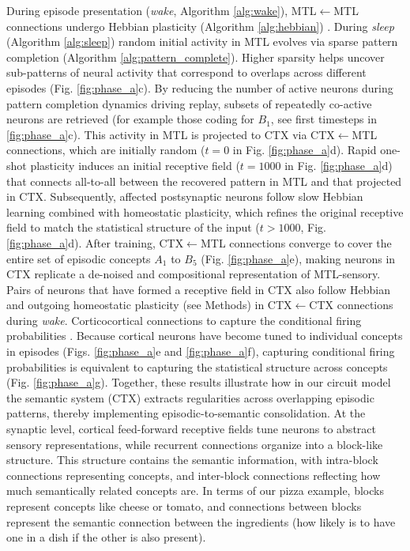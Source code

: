 \documentclass{article}
\begin{document}
During episode presentation (\textit{wake}, Algorithm \ref{alg:wake}), MTL$\leftarrow$MTL connections undergo Hebbian plasticity (Algorithm \ref{alg:hebbian}) . During \textit{sleep} (Algorithm \ref{alg:sleep}) random initial activity in MTL evolves via sparse pattern completion (Algorithm \ref{alg:pattern_complete}). Higher sparsity helps uncover sub-patterns of neural activity that correspond to overlaps across different episodes (Fig. \ref{fig:phase_a}c). By reducing the number of active neurons during pattern completion dynamics driving replay, subsets of repeatedly co-active neurons are retrieved (for example those coding for $B_1$, see first timesteps in \ref{fig:phase_a}c). This activity in MTL is projected to CTX via CTX$\leftarrow$MTL connections, which are initially random ($t=0$ in Fig. \ref{fig:phase_a}d). Rapid one-shot plasticity induces an initial receptive field ($t=1000$ in Fig. \ref{fig:phase_a}d) that connects all-to-all between the recovered pattern in MTL and that projected in CTX. Subsequently, affected postsynaptic neurons follow slow Hebbian learning combined with homeostatic plasticity, which refines the original receptive field to match the statistical structure of the input ($t > 1000$, Fig. \ref{fig:phase_a}d). After training, CTX$\leftarrow$MTL connections converge to cover the entire set of episodic concepts $A_1$ to $B_5$ (Fig. \ref{fig:phase_a}e), making neurons in CTX replicate a de-noised and compositional representation of MTL-sensory.
\newline\newline
Pairs of neurons that have formed a receptive field in CTX also follow Hebbian and outgoing homeostatic plasticity (see Methods) in CTX$\leftarrow$CTX connections during \textit{wake}.  Corticocortical connections to capture the conditional firing probabilities \cite{albesagonzalez_2025}. Because cortical neurons have become tuned to individual concepts in episodes (Figs. \ref{fig:phase_a}e and \ref{fig:phase_a}f), capturing conditional firing probabilities is equivalent to 
capturing the statistical structure across concepts (Fig. \ref{fig:phase_a}g).
\newline\newline
Together, these results illustrate how in our circuit model the semantic system (CTX) extracts regularities across overlapping episodic patterns, thereby implementing episodic-to-semantic consolidation. At the synaptic level, cortical feed-forward receptive fields tune neurons to abstract sensory representations, while recurrent connections organize into a block-like structure. This structure contains the semantic information, with intra-block connections representing concepts, and inter-block connections reflecting how much semantically related concepts are. In terms of our pizza example, blocks represent concepts like cheese or tomato, and connections between blocks represent the semantic connection between the ingredients (how likely is to have one in a dish if the other is also present). 
\end{document}

